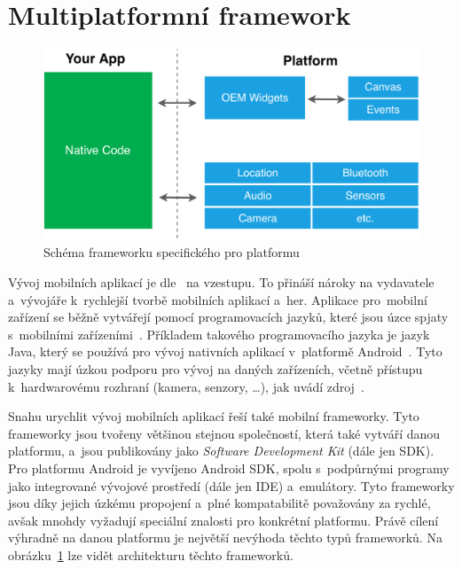 \section{Multiplatformní framework}

\begin{figure}
    \centering
    \includegraphics[width=\linewidth]{assets/technology-research/framework/platform_sdk.pdf}
    \caption{Schéma frameworku specifického pro platformu~\cite{hackernoon_flutter}}
    \label{fig:framework_platform}
\end{figure}

Vývoj mobilních aplikací je dle~\cite{wepc_video_game_statistics} na vzestupu.
To přináší nároky na vydavatele a~vývojáře k~rychlejší tvorbě mobilních
aplikací a~her.
Aplikace pro~mobilní zařízení se běžně vytvářejí pomocí programovacích jazyků,
které jsou úzce spjaty
s~mobilními zařízeními~\cite{dashmagazine_mobile_frameworks}.
Příkladem takového programovacího jazyka je jazyk Java,
který se používá pro vývoj nativních aplikací
v~platformě Android~\cite{dashmagazine_mobile_frameworks}.
Tyto jazyky mají úzkou podporu pro vývoj na daných zařízeních,
včetně přístupu k~hardwarovému rozhraní (kamera, senzory, \dots{}),
jak uvádí zdroj~\cite{dashmagazine_mobile_frameworks}. 

Snahu urychlit vývoj mobilních aplikací řeší také mobilní frameworky.
Tyto frameworky jsou tvořeny většinou stejnou společností,
která také vytváří danou platformu,
a~jsou publikovány jako \emph{Software Development Kit} (dále jen SDK).
Pro platformu Android je vyvíjeno Android SDK,
spolu s~podpůrnými programy jako integrované vývojové prostředí
(dále jen IDE) a~emulátory.
Tyto frameworky jsou díky jejich úzkému propojení a~plné kompatabilitě
považovány za rychlé,
avšak mnohdy vyžadují speciální znalosti pro konkrétní platformu.
Právě cílení výhradně na danou platformu je největší nevýhoda těchto typů
frameworků.
Na obrázku~\ref{fig:framework_platform} lze vidět architekturu těchto
frameworků.~\cite{dashmagazine_mobile_frameworks}

